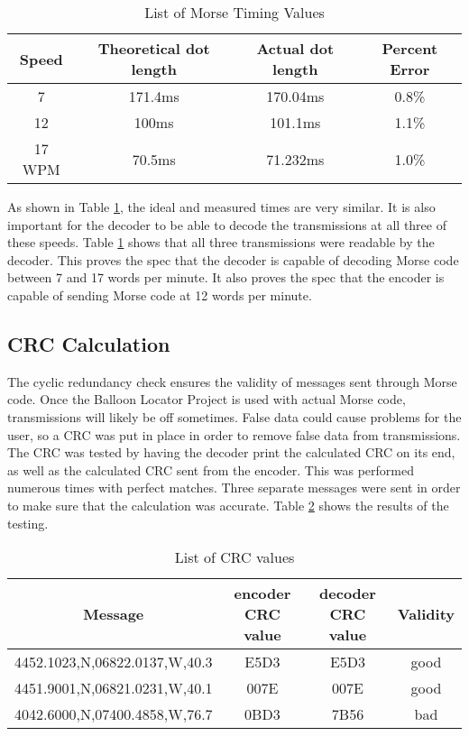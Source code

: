 \documentclass[12pt, letterpaper]{article}
\begin{document}
\begin{table}[h]
\centering
\caption{List of Morse Timing Values}
\begin{tabular}{|c|c|c|c|}
\hline
  Speed & Theoretical dot length & Actual dot length & Percent Error\\
 \hline \hline
   7 & 171.4ms & 170.04ms & 0.8\% \\
 \hline
    12 & 100ms & 101.1ms & 1.1\% \\
 \hline
  17 WPM & 70.5ms & 71.232ms & 1.0\% \\
 \hline
 \end{tabular}
 \label{ASSTABLEHA}
 \end{table}

As shown in Table \ref{ASSTABLEHA}, the ideal and measured times are very similar. It is also important for the decoder to be able to decode the transmissions at all three of these speeds. Table \ref{ASSTABLEHA} shows that all three transmissions were readable by the decoder. This proves the spec that the decoder is capable of decoding Morse code between 7 and 17 words per minute. It also proves the spec that the encoder is capable of sending Morse code at 12 words per minute.  


\subsection{CRC Calculation}
The cyclic redundancy check ensures the validity of messages sent through Morse code. Once the Balloon Locator Project is used with actual Morse code, transmissions will likely be off sometimes. False data could cause problems for the user, so a CRC was put in place in order to remove false data from transmissions. The CRC was tested by having the decoder print the calculated CRC on its end, as well as the calculated CRC sent from the encoder. This was performed numerous times with perfect matches. Three separate messages were sent in order to make sure that the calculation was accurate. Table \ref{CRCASSTABLE} shows the results of the testing.

\begin{table}[h]
\centering
\caption{List of CRC values}
\begin{tabular}{|c|c|c|c|}
\hline
  Message & encoder CRC value & decoder CRC value & Validity\\
 \hline \hline
   4452.1023,N,06822.0137,W,40.3 & E5D3 & E5D3 & good \\
 \hline
   4451.9001,N,06821.0231,W,40.1 & 007E & 007E & good \\
 \hline
    4042.6000,N,07400.4858,W,76.7 & 0BD3 & 7B56 & bad\\
 \hline
 
 \end{tabular}
 \label{CRCASSTABLE}
 \end{table}
\end{document}
